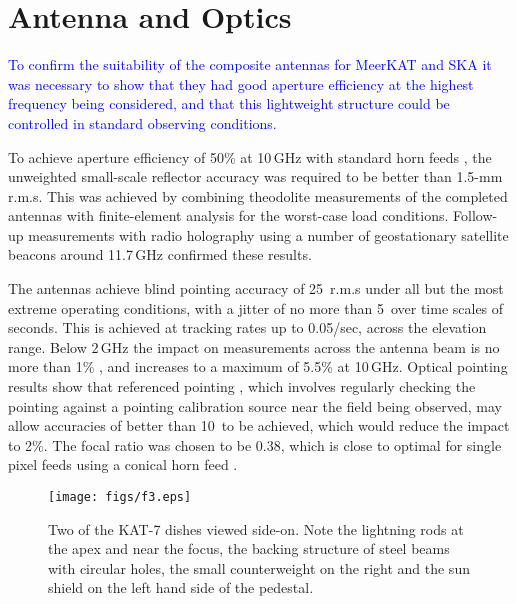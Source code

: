 \section{Antenna and Optics}
\label{sec:ant}


\noindent
\textcolor{blue}{
To confirm the suitability of the composite antennas for MeerKAT and SKA
it was necessary to show that they had good aperture efficiency at the
highest frequency being considered, and that this lightweight structure
could be controlled in standard observing conditions.}

To achieve aperture efficiency of 50\% at 10\,GHz with standard
horn feeds \citep{olver}, the unweighted
small-scale reflector accuracy was required to be better than 1.5-mm
r.m.s. This was achieved by combining theodolite
measurements of the completed antennas with finite-element analysis
for the worst-case load conditions. Follow-up measurements with radio
holography \citep{scott} using a number of geostationary satellite
beacons around 11.7\,GHz confirmed these results.

The antennas achieve blind pointing accuracy of 25\arcsec\ r.m.s under
all but the most extreme operating conditions, with a jitter of no
more than 5\arcsec\ over time scales of seconds. This is achieved at
tracking rates up to 0.05\degr/sec, across the elevation range. Below
2\,GHz the impact on measurements across the antenna beam is no more
than 1\% , and increases to a maximum of 5.5\% at 10\,GHz. Optical
pointing results show that referenced pointing \citep{rupen}, which
involves regularly checking the pointing against a pointing
calibration source near the field being observed, may allow accuracies
of better than 10\arcsec\ to be achieved, which would reduce the
impact to 2\%.
The focal ratio was chosen to be 0.38, which is close to optimal for
single pixel feeds using a conical horn feed \citep{rudge}.

\begin{figure}
\texttt{[image: figs/f3.eps]}
\caption{Two of the KAT-7 dishes viewed side-on. Note the lightning rods at the apex and near the focus, the backing structure of steel beams with circular holes, the small counterweight on the right and the sun shield on the left hand side of the pedestal. }
\label{fig:CAD}
\end{figure}




